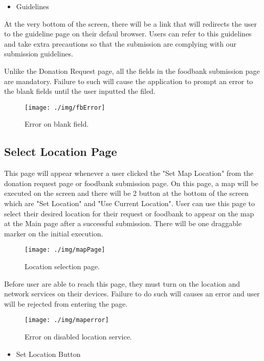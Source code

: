 \documentclass[conference]{IEEEtran}
\begin{document}
\begin{itemize}
\item Guidelines
\end{itemize}
At the very bottom of the screen, there will be a link that will redirects the user to the guideline page on their defaul browser. Users can refer to this guidelines and take extra precautions so that the submission are complying with our submission guidelines.


Unlike the Donation Request page, all the fields in the foodbank submission page are mandatory. Failure to such will cause the application to prompt an error to the blank fields until the user inputted the filed.

\begin{figure}[h!]
\texttt{[image: ./img/fbError]}
\centering
\caption{Error on blank field.}
\end{figure}

\subsection{Select Location Page}

This page will appear whenever a user clicked the "Set Map Location" from the donation request page or foodbank submission page. On this page, a map will be executed on the screen and there will be 2 button at the bottom of the screen which are "Set Location" and "Use Current Location". User can use this page to select their desired location for their request or foodbank to appear on the map at the Main page after a successful submission. There will be one draggable marker on the initial execution.

\begin{figure}[h!]
\texttt{[image: ./img/mapPage]}
\centering
\caption{Location selection page.}
\end{figure}

Before user are able to reach this page, they must turn on the location and network services on their devices. Failure to do such will causes an error and user will be rejected from entering the page.

\begin{figure}[h!]
\texttt{[image: ./img/maperror]}
\centering
\caption{Error on disabled location service.}
\end{figure}

\begin{itemize}
\item Set Location Button
\end{itemize}
\end{document}
